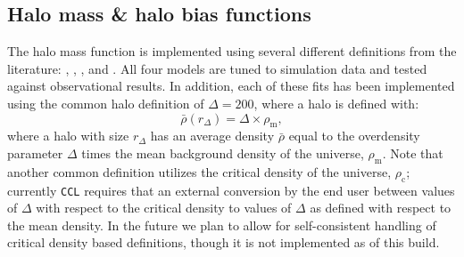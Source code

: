 \documentclass[\docopts]{\docclass}
\newcommand{\ccl}{{\tt CCL}\xspace}
\begin{document}

%
%


\subsection{Halo mass \& halo bias functions}
\label{sec:hmf}

The halo mass function is implemented using several different definitions
from the literature: \citet{Tinker2008}, \citet{Tinker2010}, \citet{Angulo2012},
and \citet{Watson2013}. All four models are tuned to simulation data and
tested against observational results. In addition, each of these fits has
been implemented using the common halo definition of $\Delta = 200$, where a
halo is defined with:
\begin{equation}
\bar{\rho}(r_{\Delta}) = \Delta \times \rho_{\mathrm{m}},
\end{equation}
where a halo with size $r_{\Delta}$ has an average density $\bar{\rho}$ equal
to the overdensity parameter $\Delta$ times the mean background density of the
universe, $\rho_{\mathrm{m}}$. Note that another common definition utilizes the
critical density of the universe, $\rho_{\mathrm{c}}$; currently \ccl requires
that an external conversion by the end user between values of $\Delta$ with
respect to the critical density to values of $\Delta$ as defined with respect
to the mean density. In the future we plan to allow for self-consistent handling
of critical density based definitions, though it is not implemented as of this build.
\end{document}
